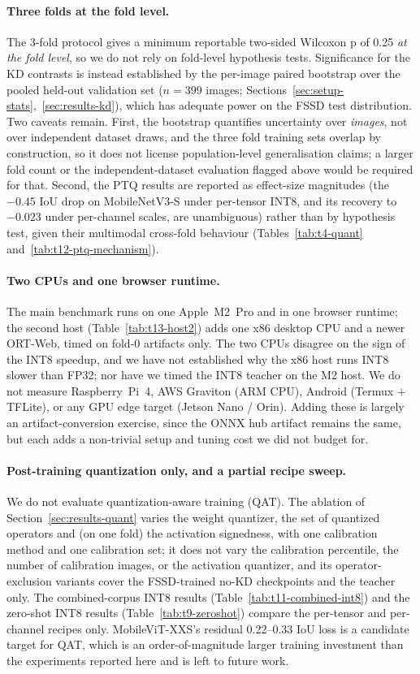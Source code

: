 \paragraph{Three folds at the fold level.} The 3-fold protocol gives a minimum reportable two-sided Wilcoxon p of 0.25 \emph{at the fold level}, so we do not rely on fold-level hypothesis tests. Significance for the KD contrasts is instead established by the per-image paired bootstrap over the pooled held-out validation set ($n=399$ images; Sections~\ref{sec:setup-stats},~\ref{sec:results-kd}), which has adequate power on the FSSD test distribution. Two caveats remain. First, the bootstrap quantifies uncertainty over \emph{images}, not over independent dataset draws, and the three fold training sets overlap by construction, so it does not license population-level generalisation claims; a larger fold count or the independent-dataset evaluation flagged above would be required for that. Second, the PTQ results are reported as effect-size magnitudes (\eg the $-0.45$ IoU drop on MobileNetV3-S under per-tensor INT8, and its recovery to $-0.023$ under per-channel scales, are unambiguous) rather than by hypothesis test, given their multimodal cross-fold behaviour (Tables~\ref{tab:t4-quant} and~\ref{tab:t12-ptq-mechanism}).

\paragraph{Two CPUs and one browser runtime.} The main benchmark runs on one Apple~M2~Pro and in one browser runtime; the second host (Table~\ref{tab:t13-host2}) adds one x86 desktop CPU and a newer ORT-Web, timed on fold-0 artifacts only. The two CPUs disagree on the sign of the INT8 speedup, and we have not established why the x86 host runs INT8 slower than FP32; nor have we timed the INT8 teacher on the M2 host. We do not measure Raspberry~Pi~4, AWS Graviton (ARM CPU), Android (Termux $+$ TFLite), or any GPU edge target (Jetson Nano / Orin). Adding these is largely an artifact-conversion exercise, since the ONNX hub artifact remains the same, but each adds a non-trivial setup and tuning cost we did not budget for.

\paragraph{Post-training quantization only, and a partial recipe sweep.} We do not evaluate quantization-aware training (QAT). The ablation of Section~\ref{sec:results-quant} varies the weight quantizer, the set of quantized operators and (on one fold) the activation signedness, with one calibration method and one calibration set; it does not vary the calibration percentile, the number of calibration images, or the activation quantizer, and its operator-exclusion variants cover the FSSD-trained no-KD checkpoints and the teacher only. The combined-corpus INT8 results (Table~\ref{tab:t11-combined-int8}) and the zero-shot INT8 results (Table~\ref{tab:t9-zeroshot}) compare the per-tensor and per-channel recipes only. MobileViT-XXS's residual 0.22--0.33 IoU loss is a candidate target for QAT, which is an order-of-magnitude larger training investment than the experiments reported here and is left to future work.

